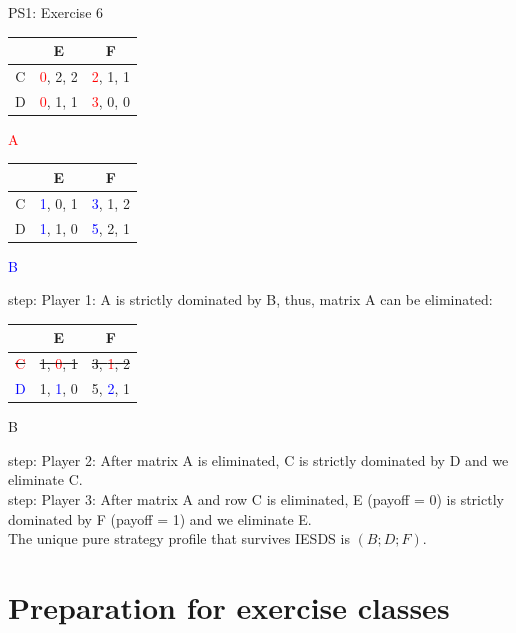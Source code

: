 \begin{frame}{PS1: Exercise 6}
\begin{multicols}{2}
\begin{table}
  \begin{tabular}{c|c|c}
      & E       & F       \\
    \midrule
    C & \textcolor{red}{0}, 2, 2 & \textcolor{red}{2}, 1, 1 \\
    \midrule
    D & \textcolor{red}{0}, 1, 1 & \textcolor{red}{3}, 0, 0
  \end{tabular}
  \center \textcolor{red}{A}
\end{table}
\vfill\null \columnbreak
\begin{table}
  \begin{tabular}{c|c|c}
      & E       & F       \\
    \midrule
    C & \textcolor{blue}{1}, 0, 1 & \textcolor{blue}{3}, 1, 2 \\
    \midrule
    D & \textcolor{blue}{1}, 1, 0 & \textcolor{blue}{5}, 2, 1
  \end{tabular}
  \center \textcolor{blue}{B}
\end{table}
\end{multicols}
 step: Player 1: A is strictly dominated by B, thus, matrix A can be eliminated:
\begin{multicols}{2}
\vfill\null \columnbreak
\begin{table}
  \begin{tabular}{c|c|c}
      & E       & F       \\
    \midrule
    \sout{\textcolor{red}{C}} & \sout{1, \textcolor{red}{0}, 1} & \sout{3, \textcolor{red}{1}, 2} \\
    \midrule
    \textcolor{blue}{D} & 1, \textcolor{blue}{1}, 0 & 5, \textcolor{blue}{2}, 1
  \end{tabular}
  \center B
\end{table}
\end{multicols}
 step: Player 2: After matrix A is eliminated, C is strictly dominated by D and we eliminate C.
\\\medskip
{} step: Player 3: After matrix A and row C is eliminated, E (payoff = 0) is strictly dominated by F (payoff = 1) and we eliminate E.
\\\medskip
The unique pure strategy profile that survives IESDS is $(B;D;F)$.
\end{frame}


\section{Preparation for exercise classes}

